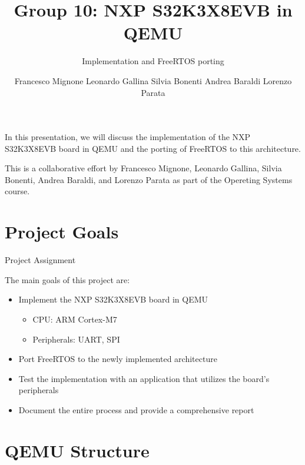 \documentclass{beamer}
\title{Group 10: NXP S32K3X8EVB in QEMU}
\subtitle{Implementation and FreeRTOS porting}
\author{Francesco Mignone  Leonardo Gallina  Silvia Bonenti  Andrea Baraldi  Lorenzo Parata}
\newcommand{\hrefcol}[2]{\textcolor{cyan}{\href{#1}{#2}}}
\begin{document}
\maketitle

\begin{frame}

In this presentation, we will discuss the implementation of the NXP S32K3X8EVB board in QEMU and the porting of FreeRTOS to this architecture.

\vspace{\baselineskip}

This is a collaborative effort by Francesco Mignone, Leonardo Gallina, Silvia Bonenti, Andrea Baraldi, and Lorenzo Parata as part of the Opereting Systems course.


\end{frame}

\section{Project Goals}

\begin{frame}{Project Assignment}

    The main goals of this project are:
    \begin{itemize}
        \item {Implement the NXP S32K3X8EVB board in QEMU
            \begin{itemize}
                \item CPU: ARM Cortex-M7
                \item Peripherals: UART, SPI
            \end{itemize}
        }
        \item Port FreeRTOS to the newly implemented architecture
        \item Test the implementation with an application that utilizes the board's peripherals
        \item Document the entire process and provide a comprehensive report
    \end{itemize}
\end{frame}



\section{QEMU Structure}
\end{document}
